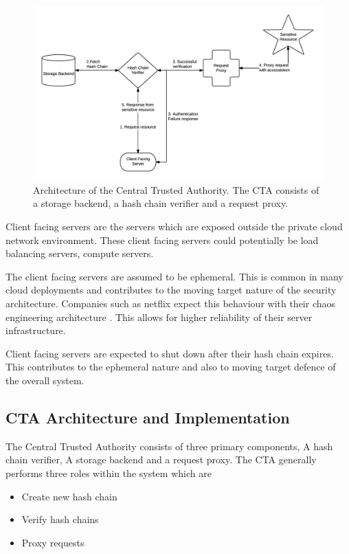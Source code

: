 \documentclass[12pt,conference]{IEEEtran}
\begin{document}
\begin{figure}[!ht]
  \centering
  \includegraphics[keepaspectratio=true,scale=0.8]{cta_architecture}
  \caption{Architecture of the Central Trusted Authority. The CTA consists of a storage backend, a hash chain verifier and a request proxy.}
  \label{fig:ctaarchitecture}
\end{figure}


Client facing servers are the servers which are exposed outside the private cloud network environment. These client facing servers could potentially be load balancing servers, compute servers.

The client facing servers are assumed to be ephemeral. This is common in many cloud deployments \cite{vaquero_dynamically_2011} and contributes to the moving target nature of the security architecture. Companies such as netflix expect this behaviour with their chaos engineering architecture \cite{basiri_chaos_2016}. This allows for higher reliability of their server infrastructure.

Client facing servers are expected to shut down after their hash chain expires. This contributes to the ephemeral nature and also to moving target defence of the overall system.

\subsection*{CTA Architecture and Implementation}

The Central Trusted Authority consists of three primary components, A hash chain verifier, A storage backend and a request proxy. The CTA generally performs three roles within the system which are

\begin{itemize}
\item Create new hash chain
\item Verify hash chains
\item Proxy requests
\end{itemize}
\end{document}
